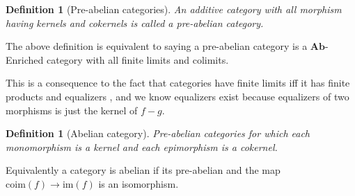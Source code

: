 \documentclass[12pt]{report}
\numberwithin{equation}{section}
\newtheorem{definition}[dummy]{Definition}
\begin{document}
	\begin{definition}[Pre-abelian categories]
		An additive category with all morphism having kernels and cokernels is called a pre-abelian category.
	\end{definition}
	The above definition is equivalent to saying a pre-abelian category is a $\mathbf{Ab}$-Enriched category with all finite limits and colimits. 
	
	This is a consequence to the fact that categories have finite limits iff it has finite products and equalizers \cite[Proposition~5.21]{Awodey}, and we know equalizers exist because equalizers of two morphisms is just the kernel of $f-g$.
	
	
	
	
	\begin{definition}[Abelian category]
		Pre-abelian categories for which each monomorphism is a kernel and each epimorphism is a cokernel.
	\end{definition}
	Equivalently a category is abelian if its pre-abelian and the map \( \mathrm{coim}(f)\to\mathrm{im}(f) \) is an isomorphism.
	
\end{document}
